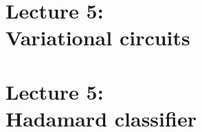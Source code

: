 \section{Lecture 5:\\ Variational circuits}
\SectionPage{}



\section{Lecture 5:\\ Hadamard classifier}
\SectionPage{}









%
%
%

